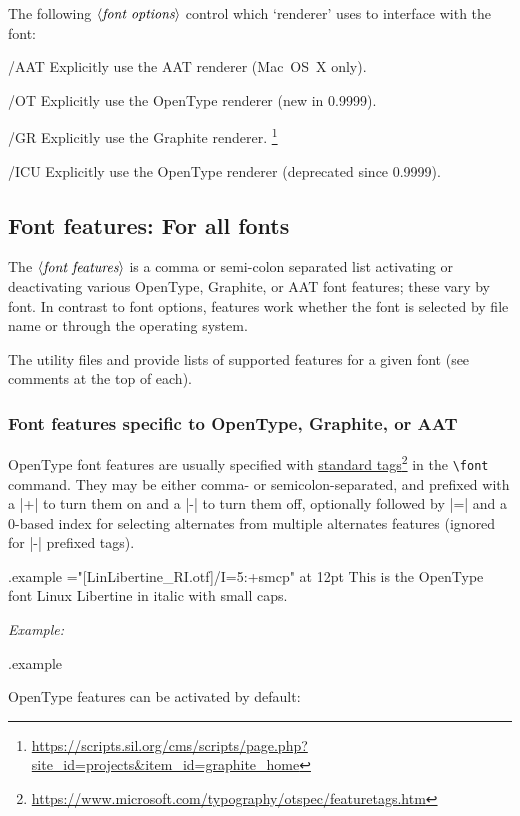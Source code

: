 \documentclass[12pt]{article}
\newcommand\xetex  {\hologo{XeTeX}\xspace}
\newenvironment{optdesc}
  {\begin{description}[font=\ttfamily,style=nextline,leftmargin=1.5cm]}
  {\end{description}}
\newcommand\xarg[1]{$\langle\hbox{\rmfamily\itshape #1}\rangle$}
\def\cs#1{\texttt{\textbackslash#1}}
\edef\examplefilename{\jobname.example}
\newlength\exampleindent
\newenvironment{example}
  {\VerbatimEnvironment
   \begin{VerbatimOut}{\examplefilename}}
  {\end{VerbatimOut}
   \typesetexample}
\newcommand\typesetexample{%
  \begin{trivlist}\item[]
  \vrule
  \hspace{\exampleindent}
  \begin{minipage}{\linewidth-\exampleindent-\exampleindent}
    \hfuzz=24pt %
    \textit{Example:}\par
    \vspace{0.4\baselineskip}
    \BVerbatimInput[fontsize=\small]{\examplefilename}\par
    \vspace{0.4\baselineskip}
    \color[rgb]{0.7,0,0}\examplefilename\relax
  \end{minipage}\par
  \end{trivlist}}
\newcommand\hlink[2]{\href{#1}{#2}\footnote{\url{#1}}}
\begin{document}
The following \xarg{font options} control which `renderer' \xetex uses to interface with the font:
\begin{optdesc}
\item[/AAT] Explicitly use the AAT renderer (Mac~OS~X only).
\item[/OT] Explicitly use the OpenType renderer (new in 0.9999).
\item[/GR] Explicitly use the Graphite renderer.%
           \footnote{\raggedright \url{https://scripts.sil.org/cms/scripts/page.php?site_id=projects&item_id=graphite_home}}
\item[/ICU] Explicitly use the OpenType renderer (deprecated since 0.9999).
\end{optdesc}


\subsection{Font features: For all fonts}

The \xarg{font features} is a comma or semi-colon separated list
activating or deactivating various OpenType, Graphite, or AAT font
features; these vary by font.  In contrast to font options,
features work whether the font is selected by file name or through the
operating system.

The \xetex utility files  and
 provide lists of supported features for a given
font (see comments at the top of each).

\subsubsection{Font features specific to OpenType, Graphite, or AAT}

OpenType font features are usually specified with
\hlink{https://www.microsoft.com/typography/otspec/featuretags.htm}{standard
tags} in the \cs{font} command. They may be either comma- or
semicolon-separated, and prefixed with a |+| to turn them on and a |-|
to turn them off, optionally followed by |=| and a 0-based index for
selecting alternates from multiple alternates features (ignored for |-|
prefixed tags).

\begin{example}
\font\liber="[LinLibertine_RI.otf]/I=5:+smcp" at 12pt
\liber This is the OpenType font Linux Libertine in italic with small caps.
\end{example}

OpenType features can be activated by default:
\end{document}
